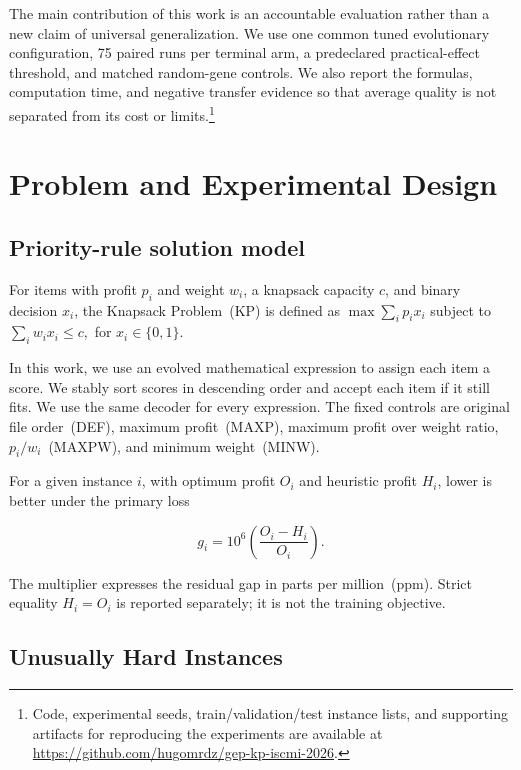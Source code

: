 \documentclass[conference]{IEEEtran}
\begin{document}
The main contribution of this work is an accountable evaluation rather than a new claim of universal generalization. We use one common tuned evolutionary configuration, 75 paired runs per terminal arm, a predeclared practical-effect threshold, and matched random-gene controls. We also report the formulas, computation time, and negative transfer evidence so that average quality is not separated from
its cost or limits.\footnote{Code, experimental seeds, train/validation/test instance lists,
and supporting artifacts for reproducing the experiments are available at\\
\url{https://github.com/hugomrdz/gep-kp-iscmi-2026}.}



\section{Problem and Experimental Design}
\label{sec:Problem}

\subsection{Priority-rule solution model}

For items with profit $p_{i}$ and weight $w_{i}$, a knapsack capacity $c$, and binary decision $x_{i}$, the Knapsack Problem~(KP) is defined as $\max \sum_{i} p_{i} x_{i}$ subject to $\sum_i w_{i} x_{i}\leq c,$ for $x_{i} \in \{0,1\}$.

In this work, we use an evolved mathematical expression to assign each item a score. We stably sort scores in descending order and accept each item if it still fits. We use the same decoder for every expression. The fixed controls are original file order~(DEF), maximum profit~(MAXP), maximum profit over weight ratio, $p_{i}/w_{i}$~(MAXPW), and minimum weight~(MINW).

For a given instance $i$, with optimum profit $O_{i}$ and heuristic profit $H_{i}$, lower is better under the primary loss

\begin{equation}
\label{eq:gap}
    g_{i}= 10^6 \left( \frac{O_i-H_i}{O_i} \right).
\end{equation}

The multiplier expresses the residual gap in parts per million~(ppm). Strict equality $H_{i}=O_{i}$ is reported separately; it is not the training objective.

\subsection{Unusually Hard Instances}
\end{document}
